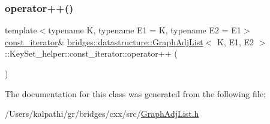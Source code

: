 \subsubsection{\texorpdfstring{operator++()}{operator++()}}
{\footnotesize\ttfamily template$<$typename K, typename E1 = K, typename E2 = E1$>$ \\
\mbox{\hyperlink{classbridges_1_1datastructure_1_1_graph_adj_list_1_1_key_set__helper_1_1const__iterator}{const\+\_\+iterator}}\& \mbox{\hyperlink{classbridges_1_1datastructure_1_1_graph_adj_list}{bridges\+::datastructure\+::\+Graph\+Adj\+List}}$<$ K, E1, E2 $>$\+::Key\+Set\+\_\+helper\+::const\+\_\+iterator\+::operator++ (\begin{DoxyParamCaption}{ }\end{DoxyParamCaption})\hspace{0.3cm}{\ttfamily [inline]}}



The documentation for this class was generated from the following file\+:\begin{DoxyCompactItemize}
\item 
/\+Users/kalpathi/gr/bridges/cxx/src/\mbox{\hyperlink{_graph_adj_list_8h}{Graph\+Adj\+List.\+h}}\end{DoxyCompactItemize}
